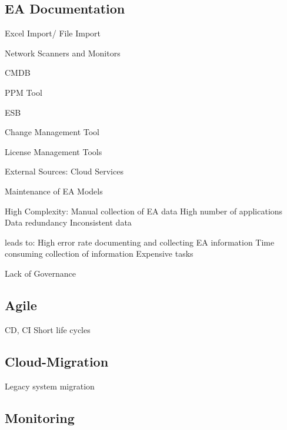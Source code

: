 \subsection{EA Documentation}



Excel Import/ File Import

Network Scanners and Monitors

CMDB

PPM Tool

ESB

Change Management Tool

License Management Tools

External Sources: Cloud Services


Maintenance of EA Models

High Complexity: Manual collection of EA data
High number of applications
Data redundancy
Inconsistent data

leads to: High error rate documenting and collecting EA information
Time consuming collection of information
Expensive tasks


Lack of Governance





\subsection{Agile}
CD, CI
Short life cycles

\subsection{Cloud-Migration}

Legacy system migration

\subsection{Monitoring}